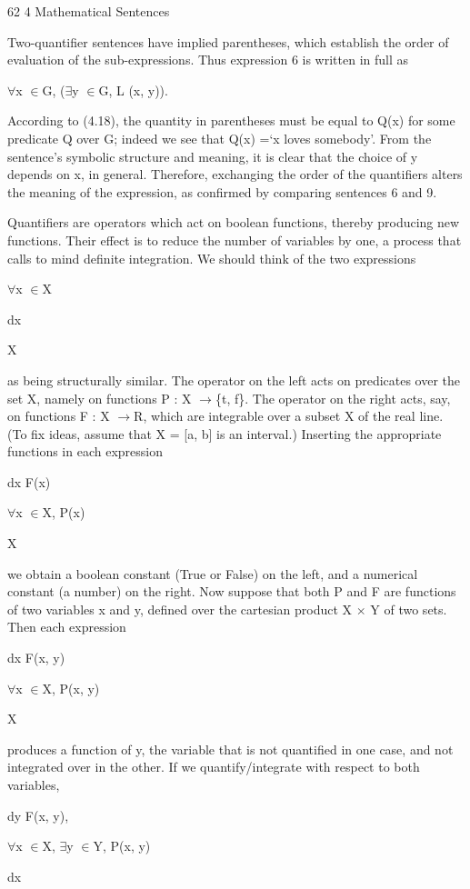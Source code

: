 \documentclass[11pt]{article}
\theoremstyle{plain}
\theoremstyle{definition}
\begin{document}
62 4 Mathematical Sentences

Two-quantifier sentences have implied parentheses, which establish the order of evaluation of the sub-expressions. Thus expression 6 is written in full as

$\forall$x $\in$G, ($\exists$y $\in$G, L (x, y)).

According to (4.18), the quantity in parentheses must be equal to Q(x) for some predicate Q over G; indeed we see that Q(x) =`x loves somebody'. From the sentence's symbolic structure and meaning, it is clear that the choice of y depends on x, in general. Therefore, exchanging the order of the quantifiers alters the meaning of the expression, as confirmed by comparing sentences 6 and 9.

Quantifiers are operators which act on boolean functions, thereby producing new functions. Their effect is to reduce the number of variables by one, a process that calls to mind definite integration. We should think of the two expressions

$\forall$x $\in$X

dx

X

as being structurally similar. The operator on the left acts on predicates over the set X, namely on functions P : X $\to$\{t, f\}. The operator on the right acts, say, on functions F : X $\to$R, which are integrable over a subset X of the real line. (To fix ideas, assume that X = [a, b] is an interval.) Inserting the appropriate functions in each expression

dx F(x)

$\forall$x $\in$X, P(x)

X

we obtain a boolean constant (True or False) on the left, and a numerical constant (a number) on the right. Now suppose that both P and F are functions of two variables x and y, defined over the cartesian product X $\times$ Y of two sets. Then each expression

dx F(x, y)

$\forall$x $\in$X, P(x, y)

X

produces a function of y, the variable that is not quantified in one case, and not integrated over in the other. If we quantify/integrate with respect to both variables,

dy F(x, y),

$\forall$x $\in$X, $\exists$y $\in$Y, P(x, y)

dx
\end{document}
